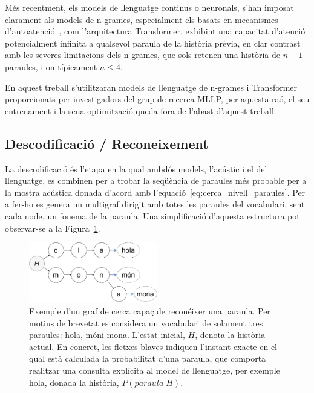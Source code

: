 Més recentment, els models de llenguatge continus o neuronals, s'han imposat clarament als models de n-grames, especialment els basats en mecanismes d'autoatenció~\cite{wang2019transformers_lm, baqueroarnal20_interspeech}, com l'arquitectura Transformer, exhibint una capacitat d'atenció potencialment infinita a qualsevol paraula de la història prèvia, en clar contrast amb les severes limitacions dels n-grames, que sols retenen una història de $n-1$ paraules, i on típicament $n \leq 4$.

En aquest treball s'utilitzaran models de llenguatge de n-grames i Transformer proporcionats per investigadors del grup de recerca MLLP, per aquesta raó, el seu entrenament i la seua optimització queda fora de l'abast d'aquest treball.

\subsection{Descodificació / Reconeixement}
\label{cap02_asr_decoder}

La descodificació és l'etapa en la qual ambdós models, l'acústic i el del llenguatge, es combinen per a trobar la seqüència de paraules més probable per a la mostra acústica donada d'acord amb l'equació~\ref{eq:cerca_nivell_paraules}. Per a fer-ho es genera un multigraf dirigit amb totes les paraules del vocabulari, sent cada node, un fonema de la paraula. Una simplificació d'aquesta estructura pot observar-se a la Figura~\ref{fig:decoder_simpli}.

\begin{figure}[ht!]
\centering
\includegraphics[width=0.5\textwidth]{figuras/espai_cerca.pdf}
\caption{Exemple d'un graf de cerca capaç de reconéixer una paraula. Per motius de brevetat es considera un vocabulari de solament tres paraules: \guillemotleft hola\guillemotright, \guillemotleft món\guillemotright i \guillemotleft mona\guillemotright. L'estat inicial, $H$, denota la història actual. En concret, les fletxes blaves indiquen l'instant exacte en el qual està calculada la probabilitat d'una paraula, que comporta realitzar una consulta explícita al model de llenguatge, per exemple \guillemotleft hola\guillemotright, donada la història, $P(paraula | H)$.}
\label{fig:decoder_simpli}
\end{figure}

